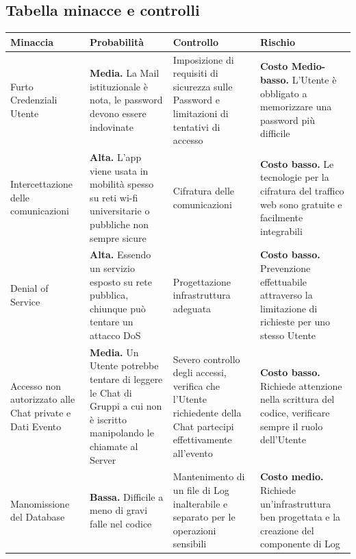 \documentclass[12pt,a4paper]{report}
\begin{document}
\subsection{Tabella minacce e controlli}
\begin{tabularx}{\textwidth}{|X|X|X|X|}
    \hline
    \rowcolor{studyColor} \textbf{Minaccia} & \textbf{Probabilità} & \textbf{Controllo} & \textbf{Rischio} \\ \hline
    \endhead
    Furto Credenziali Utente & \textbf{Media.} La Mail istituzionale è nota, le password devono essere indovinate & Imposizione di requisiti di sicurezza sulle Password e limitazioni di tentativi di accesso
        & \textbf{Costo Medio-basso.} L'Utente è obbligato a memorizzare una password più difficile \\ \hline
    Intercettazione delle comunicazioni & \textbf{Alta.} L'app viene usata in mobilità spesso su reti wi-fi universitarie o pubbliche non sempre sicure & Cifratura delle comunicazioni
        & \textbf{Costo basso.} Le tecnologie per la cifratura del traffico web sono gratuite e facilmente integrabili \\ \hline
    Denial of Service & \textbf{Alta.} Essendo un servizio esposto su rete pubblica, chiunque può tentare un attacco DoS & Progettazione infrastruttura adeguata 
        & \textbf{Costo basso.} Prevenzione effettuabile attraverso la limitazione di richieste per uno stesso Utente \\ \hline
    Accesso non autorizzato alle Chat private e Dati Evento & \textbf{Media.} Un Utente potrebbe tentare di leggere le Chat di Gruppi a cui non è iscritto manipolando le chiamate al Server
        & Severo controllo degli accessi, verifica che l'Utente richiedente della Chat partecipi effettivamente all'evento
        & \textbf{Costo basso.} Richiede attenzione nella scrittura del codice, verificare sempre il ruolo dell'Utente \\ \hline
    Manomissione del Database & \textbf{Bassa.} Difficile a meno di gravi falle nel codice & Mantenimento di un file di Log inalterabile e separato per le operazioni sensibili
        & \textbf{Costo medio.} Richiede un'infrastruttura ben progettata e la creazione del componente di Log \\ \hline
\end{tabularx}
\end{document}
